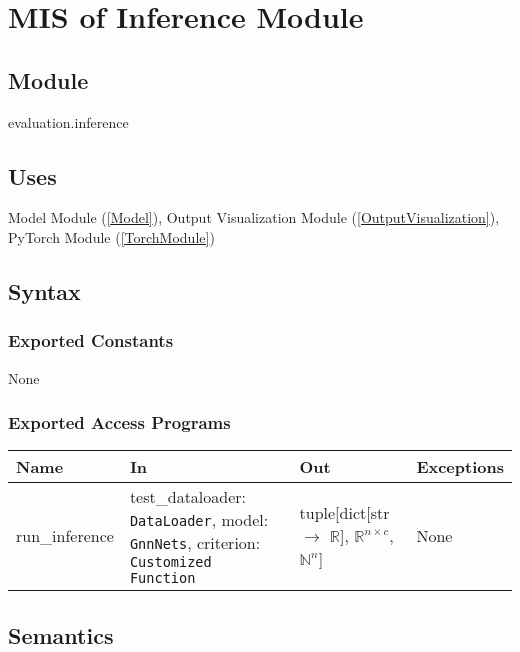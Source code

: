 \documentclass[12pt, titlepage]{article}
\begin{document}
\newpage








\section{MIS of Inference Module} \label{Test}

\subsection{Module}
evaluation.inference

\subsection{Uses}
Model Module (\ref{Model}), Output Visualization Module (\ref{OutputVisualization}), PyTorch Module (\ref{TorchModule})

\subsection{Syntax}

\subsubsection{Exported Constants}
None

\subsubsection{Exported Access Programs}
\begin{center}
\begin{tabular}{p{3cm} >{\raggedright\arraybackslash}p{6cm} p{5cm} p{2.5cm}}
\hline
\textbf{Name} & \textbf{In} & \textbf{Out} & \textbf{Exceptions} \\
\hline
run\_inference & test\_dataloader: \texttt{DataLoader}, model: \texttt{GnnNets}, criterion: \texttt{Customized Function} & tuple[dict[str $\rightarrow$ \(\mathbb{R}\)], \(\mathbb{R}^{n \times c}\), \(\mathbb{N}^n\)] & None \\
\hline
\end{tabular}
\end{center}

\subsection{Semantics}
\end{document}
